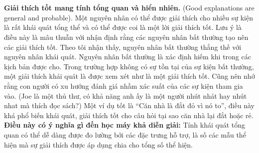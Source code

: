 \\\\\textbf{Giải thích tốt mang tính tổng quan và hiển nhiên.} (Good explanations are general and probable). Một nguyên nhân có thể được giải thích cho nhiều sự kiện là rất khái quát tổng thể và có thể được coi là một lời giải thích tốt. Lưu ý là điều này là mâu thuẫn với nhận định rằng các nguyên nhân bất thường tạo nên các giải thích tốt. Theo tôi nhận thấy, nguyên nhân bất thường thắng thế với nguyên nhân khái quát. Nguyên nhân bất thường là xác định hiếm khi trong các kịch bản được cho. Trong trường hợp không có sự tồn tại của sự kiện bất thường, một giải thích khái quát là được xem xét như là một giải thích tốt. Cũng nên nhớ rằng con người có xu hướng đánh giá nhầm xác suất của các sự kiện tham gia vào. (Joe là một thủ thư, có khả năng anh ấy là một người nhút nhát hay nhút nhat mà thích đọc sách?) Một ví dụ tốt là “Căn nhà là đắt đỏ vì nó to”, điều này khá phổ biến khái quát, giải thích tốt cho câu hỏi tại sao căn nhà lại đắt hoặc rẻ.
\\\textbf{Điều này có ý nghĩa gì đến học máy khả diễn giải:} Tính khái quát tổng quan có thể dễ dàng được đo lường bởi các đặc trưng hỗ trợ, là số các mẫu thể hiện mà sự giải thích được áp dụng chia cho tổng số thể hiện.




